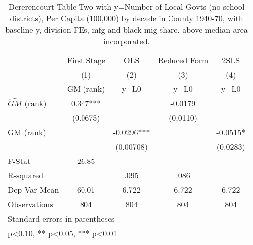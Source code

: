 \begin{table}[htbp]\centering
\def\sym#1{\ifmmode^{#1}\else\(^{#1}\)\fi}
\caption{Dererencourt Table Two with y=Number of Local Govts (no school districts), Per Capita (100,000) by decade in County 1940-70, with baseline y, division FEs, mfg and black mig share, above median area incorporated.}
\begin{tabular}{l*{4}{c}}
\toprule
                    & First Stage   &         OLS   &Reduced Form   &        2SLS   \\
                    &\multicolumn{1}{c}{(1)}&\multicolumn{1}{c}{(2)}&\multicolumn{1}{c}{(3)}&\multicolumn{1}{c}{(4)}\\
                    &\multicolumn{1}{c}{GM  (rank)}&\multicolumn{1}{c}{y\_L0}&\multicolumn{1}{c}{y\_L0}&\multicolumn{1}{c}{y\_L0}\\
\midrule
$\hat{GM}$ (rank)   &       0.347***&               &     -0.0179   &               \\
                    &    (0.0675)   &               &    (0.0110)   &               \\
\addlinespace
GM  (rank)          &               &     -0.0296***&               &     -0.0515*  \\
                    &               &   (0.00708)   &               &    (0.0283)   \\
\midrule
F-Stat              &       26.85   &               &               &               \\
R-squared           &               &        .095   &        .086   &               \\
Dep Var Mean        &       60.01   &       6.722   &       6.722   &       6.722   \\
Observations        &         804   &         804   &         804   &         804   \\
\bottomrule
\multicolumn{5}{l}{\footnotesize Standard errors in parentheses}\\
\multicolumn{5}{l}{\footnotesize * p<0.10, ** p<0.05, *** p<0.01}\\
\end{tabular}
\end{table}
